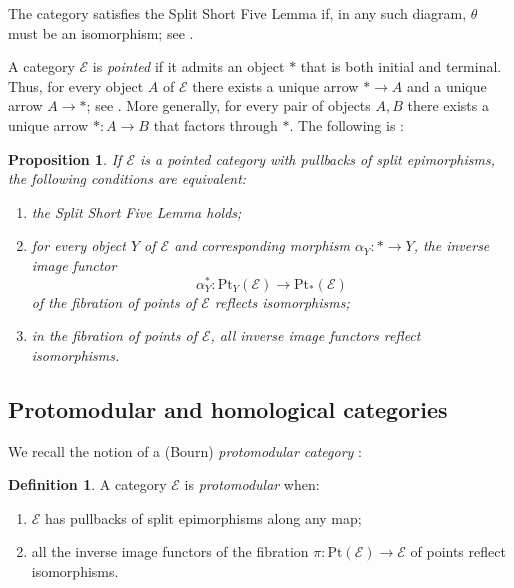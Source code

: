 \documentclass[12pt]{amsart}
\newtheorem{proposition}[theorem]{Proposition}
\theoremstyle{definition}
\newtheorem{definition}[theorem]{Definition}
\begin{document}
The category satisfies the Split Short Five Lemma if, in any such diagram, $%
\theta $ must be an isomorphism; see \cite[Definition 3.1.1]%
{borceux_malcev_2004}.

A category $\mathcal{E}$ is \emph{pointed} if it admits an object $\ast $
that is both initial and terminal. Thus, for every object $A$ of $\mathcal{E}
$ there exists a unique arrow $\ast \rightarrow A$ and a unique arrow $%
A\rightarrow \ast $; see \cite[Definition 0.2.1]{borceux_malcev_2004}. More
generally, for every pair of objects $A,B$ there exists a unique arrow $\ast
:A\rightarrow B$ that factors through $\ast $. The following is \cite[%
Proposition 3.1.2]{borceux_malcev_2004}:

\begin{proposition}
If $\mathcal{E}$ is a pointed category with pullbacks of split epimorphisms,
the following conditions are equivalent:

\begin{enumerate}
\item the Split Short Five Lemma holds;

\item for every object $Y$ of $\mathcal{E}$ and corresponding morphism $%
\alpha _{Y}:\ast \rightarrow Y$, the inverse image functor%
\begin{equation*}
\alpha _{Y}^{\ast }:\mathrm{Pt}_{Y}\left( \mathcal{E}\right) \rightarrow 
\mathrm{Pt}_{\ast }\left( \mathcal{E}\right)
\end{equation*}%
of the fibration of points of $\mathcal{E}$ reflects isomorphisms;

\item in the fibration of points of $\mathcal{E}$, all inverse image
functors reflect isomorphisms.
\end{enumerate}
\end{proposition}

\subsection{Protomodular and homological categories}

We recall the notion of a (Bourn) \emph{protomodular category} \cite[%
Proposition 3.1.3]{borceux_malcev_2004}:

\begin{definition}
\label{Definition:protomodular} A category $\mathcal{E}$ is \emph{%
protomodular} when:

\begin{enumerate}
\item $\mathcal{E}$ has pullbacks of split epimorphisms along any map;

\item all the inverse image functors of the fibration $\pi :\mathrm{Pt}%
\left( \mathcal{E}\right) \rightarrow \mathcal{E}$ of points reflect
isomorphisms.
\end{enumerate}
\end{definition}
\end{document}
